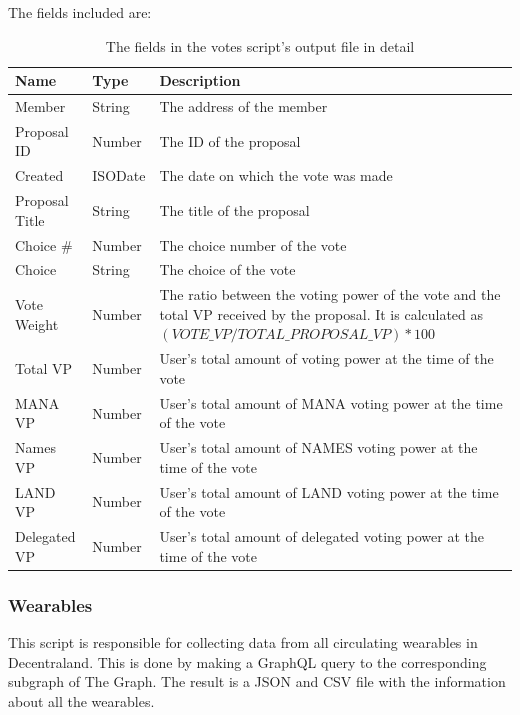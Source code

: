 \documentclass[MSE,Master,english]{twbook}%
\begin{document}
The fields included are:
\begin{table}[H]
  \centering
  \begin{tabularx}{\textwidth}{|l|l|X|}
  \hline
  \textbf{Name} & \textbf{Type} & \textbf{Description}                                             \\ \hline
  Member         & String  & The address of the member                                             \\ \hline
  Proposal ID    & Number  & The ID of the proposal                                                \\ \hline
  Created        & ISODate & The date on which the vote was made                                   \\ \hline
  Proposal Title & String  & The title of the proposal                                             \\ \hline
  Choice \#      & Number  & The choice number of the vote                                         \\ \hline
  Choice         & String  & The choice of the vote                                                \\ \hline
  Vote Weight &
    Number &
    The ratio between the voting power of the vote and the total VP received by the proposal. It is calculated as $(VOTE\_VP / TOTAL\_PROPOSAL\_VP) * 100$ \\ \hline
  Total VP       & Number  & User's total amount of voting power at the time of the vote           \\ \hline
  MANA VP        & Number  & User's total amount of MANA voting power at the time of the vote      \\ \hline
  Names VP       & Number  & User's total amount of NAMES voting power at the time of the vote     \\ \hline
  LAND VP        & Number  & User's total amount of LAND voting power at the time of the vote      \\ \hline
  Delegated VP   & Number  & User's total amount of delegated voting power at the time of the vote \\ \hline
  \end{tabularx}
  \caption{The fields in the votes script's output file in detail}
  \label{table:votes}
\end{table}

\subsubsection{Wearables}
This script is responsible for collecting data from all circulating wearables in Decentraland. This is done by making a GraphQL query to the corresponding subgraph of The Graph. The result is a JSON and CSV file with the information about all the wearables. \\
\end{document}
